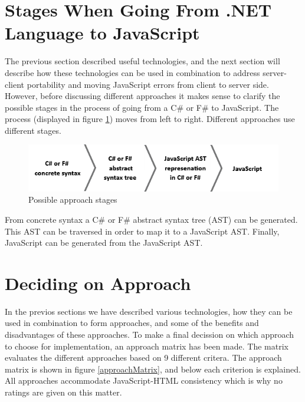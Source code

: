 \section{Stages When Going From .NET Language to JavaScript} %
\label{sec:stages_when_going_from_net_language_to_javascript}
	The previous section described useful technologies, and the next section will describe how these technologies can be used in combination to address server-client portability and moving JavaScript errors from client to server side. However, before discussing different approaches it makes sense to clarify the possible stages in the process of going from a C\# or F\# to JavaScript. The process (displayed in figure \ref{stages}) moves from left to right. Different approaches use different stages.

		\begin{figure}[H]
			\begin{center}
				\centerline{\includegraphics[width=14cm]{resources/images/stages.png}}
			\end{center}
			\caption{Possible approach stages}
			\label{stages}
		\end{figure}

	 From concrete syntax a C\# or F\# abstract syntax tree (AST) can be generated. This AST can be traversed in order to map it to a JavaScript AST. Finally, JavaScript can be generated from the JavaScript AST.



\section{Deciding on Approach} %
\label{sec:deciding_on_approach}
	In the previos sections we have described various technologies, how they can be used in combination to form approaches, and some of the benefits and disadvantages of these approaches. To make a final decission on which approach to choose for implementation, an approach matrix has been made. The matrix evaluates the different approaches based on 9 different critera. The approach matrix is shown in figure \ref{approachMatrix}, and below each criterion is explained. All approaches accommodate JavaScript-HTML consistency which is why no ratings are given on this matter.

